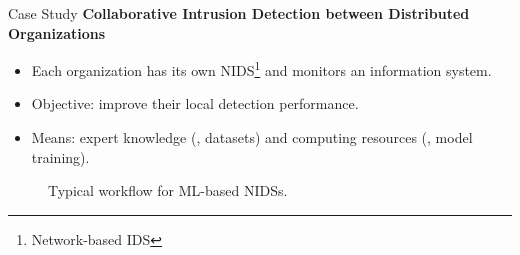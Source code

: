 


    





\begin{frame}{Case Study}
  \bigskip
  \textbf{Collaborative Intrusion Detection between Distributed Organizations}
  \begin{itemize}[<+->]
    \item Each organization has its own NIDS\footnote{Network-based IDS} and monitors an information system.
    \item Objective: improve their local detection performance.
    \item Means: \alert{expert knowledge} (\ie, datasets) and \alert{computing resources} (\ie, model training).
  \end{itemize}
  \medskip
  \onslide<+>
  \begin{figure}
    \centering
    \caption{Typical workflow for ML-based NIDSs.}
  \end{figure}
\end{frame}


